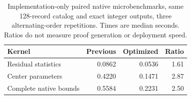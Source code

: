 \begin{table}[t]
\centering
\caption{Implementation-only paired native microbenchmarks, same 128-record catalog and exact integer outputs, three alternating-order repetitions. Times are median seconds. Ratios do not measure proof generation or deployment speed.}
\label{tab:optimized-kernels}
\begin{tabular}{lrrr}
\toprule
Kernel & Previous & Optimized & Ratio\\
\midrule
Residual statistics & 0.0862 & 0.0536 & 1.61\\
Center parameters & 0.4220 & 0.1471 & 2.87\\
Complete native bounds & 0.5584 & 0.2231 & 2.50\\
\bottomrule
\end{tabular}
\end{table}
